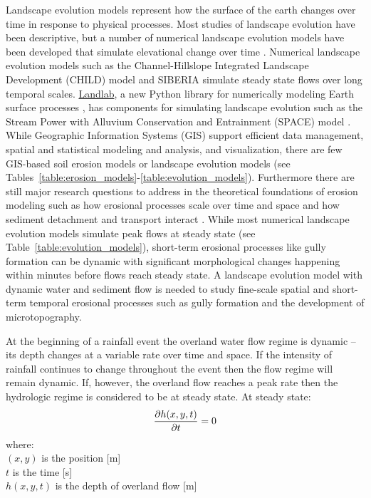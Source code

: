 \documentclass[gmd, manuscript]{copernicus}
\begin{document}
\introduction
Landscape evolution models represent how the surface of the earth changes 
over time in response to physical processes. 
Most studies of landscape evolution have been descriptive, 
but a number of numerical landscape evolution models 
have been developed that simulate elevational change over time 
\citep{Temme2013}. 
Numerical landscape evolution models
such as the Channel-Hillslope Integrated Landscape Development (CHILD) model 
\citep{Tucker2001} 
and SIBERIA \citep{Willgoose2005}
simulate steady state flows over long temporal scales. %
\href{http://landlab.github.io/}{Landlab},
a new Python library for numerically modeling Earth surface processes
\citep{Hobley2017},
has components for simulating landscape evolution such as the 
Stream Power with Alluvium Conservation and Entrainment (SPACE) 
model \citep{Shobe2017}.
While Geographic Information Systems (GIS)
support efficient data management, 
spatial and statistical modeling and analysis, 
and visualization,
there are few GIS-based soil erosion models or landscape evolution models
(see Tables~\ref{table:erosion_models}-\ref{table:evolution_models}).
Furthermore there are still major research questions 
to address in the theoretical foundations of erosion modeling 
such as how erosional processes scale over time and space 
and how sediment detachment and transport interact \citep{Mitasova2013}. 
While most numerical landscape evolution models 
simulate peak flows at steady state
(see Table~\ref{table:evolution_models}),
short-term erosional processes like gully formation can be dynamic
with significant morphological changes happening within minutes
before flows reach steady state. 
A landscape evolution model with dynamic water and sediment flow
is needed to study fine-scale spatial and short-term temporal erosional processes
such as gully formation and the development of microtopography. 

At the beginning of a rainfall event 
the overland water flow regime is dynamic -- 
its depth changes at a variable rate over time and space. 
If the intensity of rainfall continues to change throughout the event
then the flow regime will remain dynamic. 
If, however, the overland flow reaches a peak rate
then the hydrologic regime is considered to be at steady state.
At steady state:
\begin{equation}
\label{eq:steady_state}
{\partial h(x,y,t) \over \partial t} = 0
\end{equation}
%
{\small
\noindent
where: \\
\noindent
\hspace*{0.5em} $(x,y)$ is the position [\unit{m}]\\
\hspace*{0.5em} $t$ is the time [\unit{s}]\\
\hspace*{0.5em} $h(x,y,t)$ is the depth of overland flow [\unit{m}]\\
}
\end{document}
